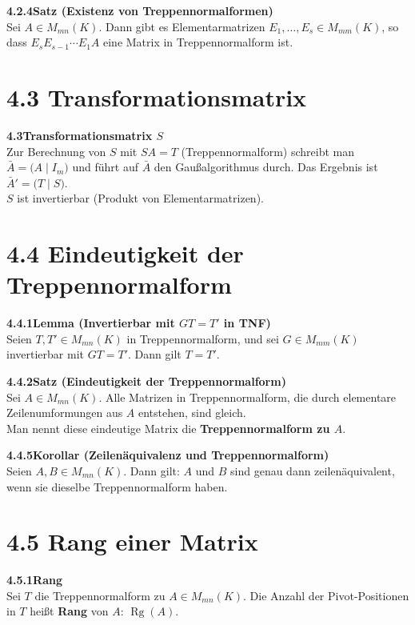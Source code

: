 \documentclass[a4paper,12pt]{article}
\newcommand{\gentry}[3]{%
  \noindent\textbf{#1\quad #2}\nopagebreak\\[0.2em]
  #3\par\smallskip
}
\begin{document}
\gentry{4.2.4}{Satz (Existenz von Treppennormalformen)}{%
  Sei $A \in M_{mn}(K)$. Dann gibt es Elementarmatrizen $E_1,\ldots,E_s \in M_{mm}(K)$,
  so dass $E_s E_{s-1} \cdots E_1 A$ eine Matrix in Treppennormalform ist.
}

\section*{4.3 \quad Transformationsmatrix}

\gentry{4.3}{Transformationsmatrix $S$}{%
  Zur Berechnung von $S$ mit $SA = T$ (Treppennormalform) schreibt man
  $\bar{A} = \bigl(A \mid I_m\bigr)$ und führt auf $\bar{A}$ den Gaußalgorithmus durch.
  Das Ergebnis ist $\bar{A}' = \bigl(T \mid S\bigr)$.
  \smallskip\\
  $S$ ist invertierbar (Produkt von Elementarmatrizen).
}

\section*{4.4 \quad Eindeutigkeit der Treppennormalform}

\gentry{4.4.1}{Lemma (Invertierbar mit $GT = T'$ in TNF)}{%
  Seien $T, T' \in M_{mn}(K)$ in Treppennormalform, und sei $G \in M_{mm}(K)$
  invertierbar mit $GT = T'$. Dann gilt $T = T'$.
}

\gentry{4.4.2}{Satz (Eindeutigkeit der Treppennormalform)}{%
  Sei $A \in M_{mn}(K)$. Alle Matrizen in Treppennormalform, die durch elementare
  Zeilenumformungen aus $A$ entstehen, sind gleich.
  \smallskip\\
  Man nennt diese eindeutige Matrix die \textbf{Treppennormalform zu $A$}.
}

\gentry{4.4.5}{Korollar (Zeilenäquivalenz und Treppennormalform)}{%
  Seien $A, B \in M_{mn}(K)$. Dann gilt:
  $A$ und $B$ sind genau dann zeilenäquivalent, wenn sie dieselbe Treppennormalform haben.
}

\section*{4.5 \quad Rang einer Matrix}

\gentry{4.5.1}{Rang}{%
  Sei $T$ die Treppennormalform zu $A \in M_{mn}(K)$. Die Anzahl der Pivot-Positionen
  in $T$ heißt \textbf{Rang} von $A$: $\operatorname{Rg}(A)$.
}
\end{document}
